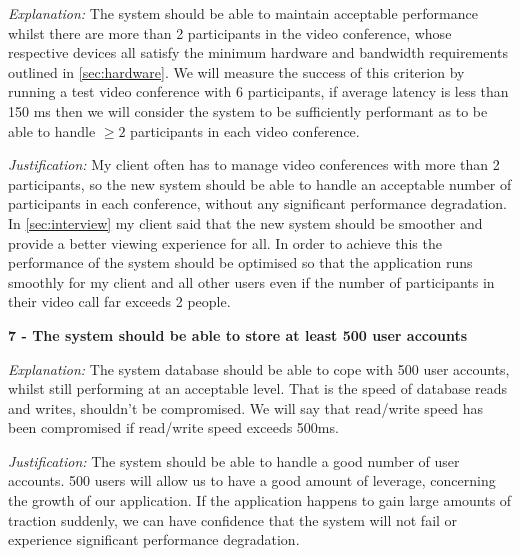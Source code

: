 \textit{Explanation:}
The system should be able to maintain acceptable performance
whilst there are more than 2 participants in the video 
conference, whose respective devices all satisfy the minimum
hardware and bandwidth requirements outlined in 
\ref{sec:hardware}. We will measure the success of this 
criterion by running a test video conference with 6 
participants, if average latency is less than 150 ms then we
will consider the system to be sufficiently performant as to 
be able to handle $\geq 2$ participants in each video
conference.
\vspace{0.1cm}

\textit{Justification:}
My client often has to manage video conferences with more than
2 participants, so the new system should be able to handle an 
acceptable number of participants in each conference, without
any significant performance degradation. In
\ref{sec:interview} my client said that the new system 
should be smoother and provide a better viewing experience 
for all. In order to achieve this the performance of the 
system should be optimised so that the application runs 
smoothly for my client and all other users even if the
number of participants in their video call far exceeds 2 
people.

\vspace{0.2cm}

\textsf{\bfseries 7 - The system should be able to store at 
least 500 user accounts}

\vspace{0.1cm}

\textit{Explanation:}
The system database should be able to cope with 500 user 
accounts, whilst still performing at an acceptable level.
That is the speed of database reads and writes, shouldn't
be compromised. We will say that read/write speed has been 
compromised if read/write speed exceeds 500ms.
\vspace{0.1cm}

\textit{Justification:}
The system should be able to handle a good number of user 
accounts. 500 users will allow us to have a good amount of 
leverage, concerning the growth of our application. If the 
application happens to gain large amounts of traction
suddenly, we can have confidence that the system will not 
fail or experience significant performance degradation.

